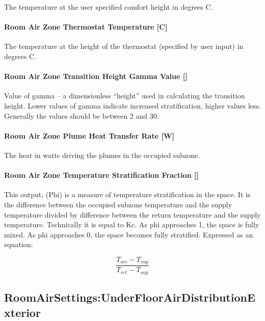 The temperature at the user specified comfort height in degrees C.

\paragraph{Room Air Zone Thermostat Temperature {[}C{]}}\label{room-air-zone-thermostat-temperature-c-1}

The temperature at the height of the thermostat (specified by user input) in degrees C.

\paragraph{Room Air Zone Transition Height Gamma Value {[]}}\label{room-air-zone-transition-height-gamma-value}

Value of gamma -- a dimensionless ``height'' used in calculating the transition height. Lower values of gamma indicate increased stratification, higher values less. Generally the values should be between 2 and 30.

\paragraph{Room Air Zone Plume Heat Transfer Rate {[}W{]}}\label{room-air-zone-plume-heat-transfer-rate-w}

The heat in watts driving the plumes in the occupied subzone.

\paragraph{Room Air Zone Temperature Stratification Fraction {[]}}\label{room-air-zone-temperature-stratification-fraction}

This output, (Phi) is a measure of temperature stratification in the space. It is the difference between the occupied subzone temperature and the supply temperature divided by difference between the return temperature and the supply temperature. Technically it is equal to Kc. As phi approaches 1, the space is fully mixed. As phi approaches 0, the space becomes fully stratified. Expressed as an equation:

\begin{equation}
  \frac{T_{occ} - T_{sup}}{T_{ret} - T_{sup}}
\end{equation}

\subsection{RoomAirSettings:UnderFloorAirDistributionExterior}\label{roomairsettingsunderfloorairdistributionexterior}

